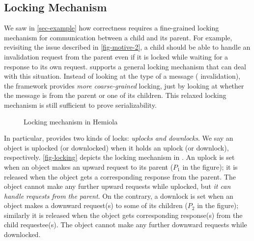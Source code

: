 \documentclass[sigplan,10pt,review,anonymous,screen]{acmart}\settopmatter{printfolios=true,printccs=false,printacmref=false}
\begin{document}
\subsection{Locking Mechanism}
\label{sec-locking-mechanism}

We saw in \autoref{sec-example} how correctness requires a fine-grained locking mechanism for communication between a child and its parent.
For example, revisiting the issue described in \autoref{fig-motive-2}, a child should be able to handle an invalidation request from the parent even if it is locked while waiting for a response to its own request.
\hemiola{} supports a general locking mechanism that can deal with this situation.
Instead of looking at the type of a message (\eg{} invalidation), the framework provides \emph{more coarse-grained} locking, just by looking at whether the message is from the parent or one of its children.
This relaxed locking mechanism is still sufficient to prove serializability.

\begin{figure}[h]
  \caption{Locking mechanism in Hemiola}
  \label{fig-locking}
\end{figure}

In particular, \hemiola{} provides two kinds of locks: \emph{uplocks and downlocks}.
We say an object is uplocked (or downlocked) when it holds an uplock (or downlock), respectively.
\autoref{fig-locking} depicts the locking mechanism in \hemiola{}.
An uplock is set when an object makes an upward request to its parent ($P_1$ in the figure); it is released when the object gets a corresponding response from the parent.
The object cannot make any further upward requests while uplocked, but \emph{it can handle requests from the parent}.
On the contrary, a downlock is set when an object makes a downward request(s) to some of its children ($P_2$ in the figure); similarly it is released when the object gets corresponding response(s) from the child requestee(s).
The object cannot make any further downward requests while downlocked.
\end{document}
